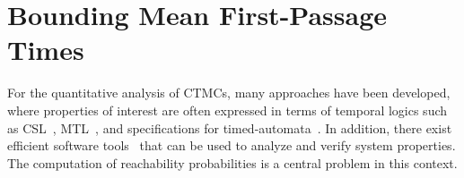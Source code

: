 \chapter{Bounding Mean First-Passage Times}\label{ch:MFPT}







For the quantitative analysis of \acp{CTMC}, many   approaches have been
developed, where properties of interest are often expressed in terms of temporal logics such as
\acs{CSL}~\cite{aziz1996verifying,baier2000model,baier2003model},
\acs{MTL}~\cite{chen2011time},
and specifications for timed-automata~\cite{chen2009quantitative,mikeev2013fly}.
In addition, there exist
efficient software
tools~\cite{hinton2006prism,kwiatkowska2011prism,dehnert2017storm}
that can be used to analyze and verify system properties.
The computation of reachability probabilities is a central problem in this context.


